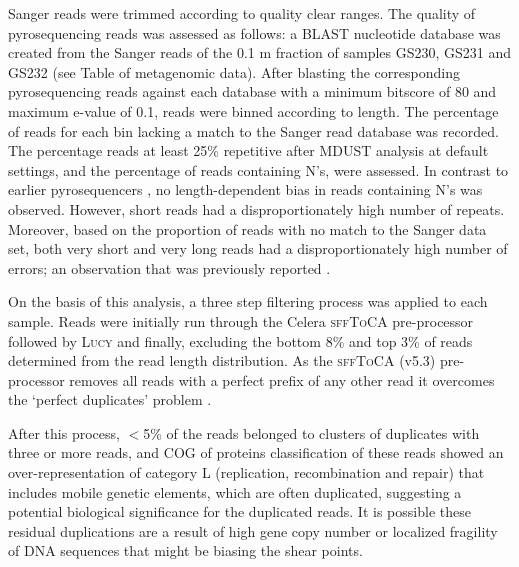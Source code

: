 Sanger reads were trimmed according to quality clear ranges.
The quality of pyrosequencing reads was assessed as follows: 
a \ac{BLAST} nucleotide database was created from the Sanger reads of the 0.1 \textmu{}m fraction of samples GS230, GS231 and GS232 (see Table of metagenomic data). %
After blasting the corresponding pyrosequencing reads against each database with a minimum bitscore of 80 and maximum e-value of 0.1, reads were binned according to length.
The percentage of reads for each bin lacking a match to the Sanger read database was recorded. 
The percentage reads at least 25\% repetitive after \textsc{MDUST} \cite{Morgulis2006} analysis at default settings, and the percentage of reads containing N's, were assessed. 
In contrast to earlier pyrosequencers \cite{Huse2007}, no length-dependent bias in reads containing N's was observed. 
However, short reads had a disproportionately high number of repeats. 
Moreover, based on the proportion of reads with no match to the Sanger data set, both very short and very long reads had a disproportionately high number of errors; an observation that was previously reported \cite{Huse2007}.

On the basis of this analysis, a three step filtering process was applied to each sample. 
Reads were initially run through the Celera \textsc{sffToCA} \cite{Miller2008} pre-processor followed by \textsc{Lucy} \cite{Chou2001} and finally, excluding the bottom 8\% and top 3\% of reads determined from the read length distribution. 
As the \textsc{sffToCA} (v5.3) pre-processor removes all reads with a perfect prefix of any other read it overcomes the `perfect duplicates’ problem \cite{Gomez-Alvarez2009}.
 
After this process, $<$5\% of the reads belonged to clusters of duplicates with three or more reads, and \ac{COG} of proteins classification of these reads showed an over-representation of category L (replication, recombination and repair) that includes mobile genetic elements, which are often duplicated, suggesting a potential biological significance for the duplicated reads. 
It is possible these residual duplications are a result of high gene copy number or localized fragility of DNA sequences that might be biasing the shear points.

